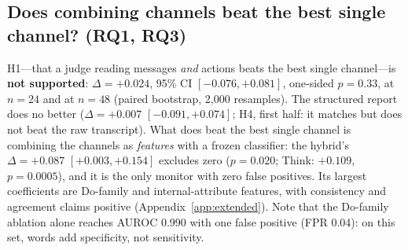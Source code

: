 \documentclass[11pt,a4paper]{article}
\newcommand{\appref}[1]{Appendix~\ref{#1}}
\begin{document}
\subsection{Does combining channels beat the best single channel? (RQ1, RQ3)}
H1---that a judge reading messages \emph{and} actions beats the best single channel---is \textbf{not supported}: $\Delta=+0.024$, 95\% CI $[-0.076,+0.081]$, one-sided $p=0.33$, at $n=24$ and at $n=48$ (paired bootstrap, 2,000 resamples). The structured report does no better ($\Delta=+0.007$ $[-0.091,+0.074]$; H4, first half: it matches but does not beat the raw transcript). What does beat the best single channel is combining the channels as \emph{features} with a frozen classifier: the hybrid's $\Delta=+0.087$ $[+0.003,+0.154]$ excludes zero ($p=0.020$; Think: $+0.109$, $p=0.0005$), and it is the only monitor with zero false positives. Its largest coefficients are Do-family and internal-attribute features, with consistency and agreement claims positive (\appref{app:extended}). Note that the Do-family ablation alone reaches AUROC 0.990 with one false positive (FPR 0.04): on this set, words add specificity, not sensitivity.
\end{document}
